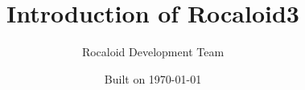 

\author{Rocaloid Development Team}
\title{Introduction of Rocaloid3}
\date{Built on \today}



\maketitle





